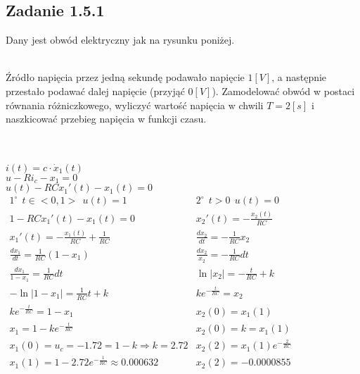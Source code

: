 \pagebreak
\subsection*{Zadanie 1.5.1} {\color{darkgray}
	Dany jest obwód elektryczny jak na rysunku poniżej.\\
	\begin{figure}[!h]
	\end{figure}
\\
Źródło napięcia przez jedną sekundę podawało napięcie $1 [V]$, a następnie przestało podawać dalej napięcie (przyjąć $0 [V]$). Zamodelować obwód w postaci równania różniczkowego, wyliczyć wartość napięcia w chwili $T = 2 [s]$ i naszkicować przebieg napięcia w funkcji czasu.\\
}\lineh
\\\\
$i(t)=c\cdot \dot{x}_1(t)$\\
$u-Ri_c-x_1=0$\\
$u(t)-RCx_1'(t)-x_1(t)=0$\\
$ \begin{array}{ll}
1^\circ \ \ t\in<0,1> \ \ \boxed{u(t)=1}&2^\circ \ \ t>0 \ \ \boxed{u(t)=0}\\
1-RCx_1'(t)-x_1(t)=0&x_2'(t)=-\frac{x_2(t)}{RC}\\
x_1'(t)=-\frac{x_1(t)}{RC}+\frac{1}{RC}&\frac{dx_2}{dt}=-\frac{1}{RC}x_2\\
\frac{dx_1}{dt}=\frac{1}{RC}(1-x_1)&\frac{dx_2}{x_2}=-\frac{1}{RC}dt\\
\frac{dx_1}{1-x_1}=\frac{1}{RC}dt&\ln|x_2|=-\frac{t}{RC}+k\\
-\ln|1-x_1|=\frac{1}{RC}t+k&ke^{-\frac{t}{RC}}=x_2\\
ke^{-\frac{t}{RC}}=1-x_1&x_2(0)=x_1(1)\\
x_1=1-ke^{-\frac{t}{RC}}&x_2(0)=k=x_1(1)\\
x_1(0)=u_c=-1.72=1-k \Rightarrow k=2.72&x_2(2)=x_1(1)e^{-\frac{2}{RC}}\\
x_1(1)=1-2.72e^{-\frac{1}{RC}} \approx 0.000632&x_2(2)=-0.0000855


\end{array}$\\








